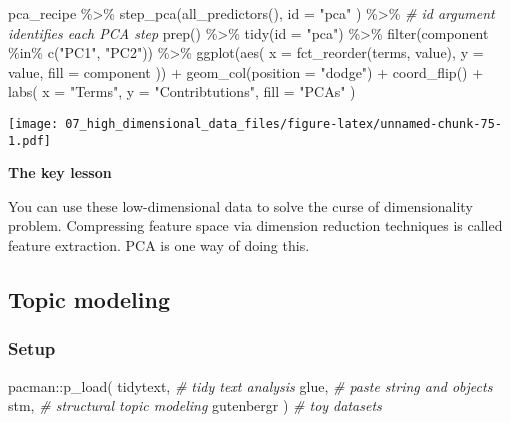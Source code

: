 \documentclass[
]{book}
\newenvironment{Shaded}{\begin{snugshade}}{\end{snugshade}}
\newcommand{\AttributeTok}[1]{\textcolor[rgb]{0.77,0.63,0.00}{#1}}
\newcommand{\CommentTok}[1]{\textcolor[rgb]{0.56,0.35,0.01}{\textit{#1}}}
\newcommand{\FunctionTok}[1]{\textcolor[rgb]{0.00,0.00,0.00}{#1}}
\newcommand{\NormalTok}[1]{#1}
\newcommand{\SpecialCharTok}[1]{\textcolor[rgb]{0.00,0.00,0.00}{#1}}
\newcommand{\StringTok}[1]{\textcolor[rgb]{0.31,0.60,0.02}{#1}}
\begin{document}
\begin{Shaded}
\begin{Highlighting}[]
\NormalTok{pca\_recipe }\SpecialCharTok{\%\textgreater{}\%}
  \FunctionTok{step\_pca}\NormalTok{(}\FunctionTok{all\_predictors}\NormalTok{(),}
    \AttributeTok{id =} \StringTok{"pca"}
\NormalTok{  ) }\SpecialCharTok{\%\textgreater{}\%} \CommentTok{\# id argument identifies each PCA step}
  \FunctionTok{prep}\NormalTok{() }\SpecialCharTok{\%\textgreater{}\%}
  \FunctionTok{tidy}\NormalTok{(}\AttributeTok{id =} \StringTok{"pca"}\NormalTok{) }\SpecialCharTok{\%\textgreater{}\%}
  \FunctionTok{filter}\NormalTok{(component }\SpecialCharTok{\%in\%} \FunctionTok{c}\NormalTok{(}\StringTok{"PC1"}\NormalTok{, }\StringTok{"PC2"}\NormalTok{)) }\SpecialCharTok{\%\textgreater{}\%}
  \FunctionTok{ggplot}\NormalTok{(}\FunctionTok{aes}\NormalTok{(}
    \AttributeTok{x =} \FunctionTok{fct\_reorder}\NormalTok{(terms, value), }\AttributeTok{y =}\NormalTok{ value,}
    \AttributeTok{fill =}\NormalTok{ component}
\NormalTok{  )) }\SpecialCharTok{+}
  \FunctionTok{geom\_col}\NormalTok{(}\AttributeTok{position =} \StringTok{"dodge"}\NormalTok{) }\SpecialCharTok{+}
  \FunctionTok{coord\_flip}\NormalTok{() }\SpecialCharTok{+}
  \FunctionTok{labs}\NormalTok{(}
    \AttributeTok{x =} \StringTok{"Terms"}\NormalTok{,}
    \AttributeTok{y =} \StringTok{"Contribtutions"}\NormalTok{,}
    \AttributeTok{fill =} \StringTok{"PCAs"}
\NormalTok{  )}
\end{Highlighting}
\end{Shaded}

\texttt{[image: 07\_high\_dimensional\_data\_files/figure-latex/unnamed-chunk-75-1.pdf]}

\textbf{The key lesson}

You can use these low-dimensional data to solve the curse of dimensionality problem. Compressing feature space via dimension reduction techniques is called feature extraction. PCA is one way of doing this.

\hypertarget{topic-modeling}{%
\subsection{Topic modeling}\label{topic-modeling}}

\hypertarget{setup-6}{%
\subsubsection{Setup}\label{setup-6}}

\begin{Shaded}
\begin{Highlighting}[]
\NormalTok{pacman}\SpecialCharTok{::}\FunctionTok{p\_load}\NormalTok{(}
\NormalTok{  tidytext, }\CommentTok{\# tidy text analysis}
\NormalTok{  glue, }\CommentTok{\# paste string and objects}
\NormalTok{  stm, }\CommentTok{\# structural topic modeling}
\NormalTok{  gutenbergr}
\NormalTok{) }\CommentTok{\# toy datasets}
\end{Highlighting}
\end{Shaded}
\end{document}
